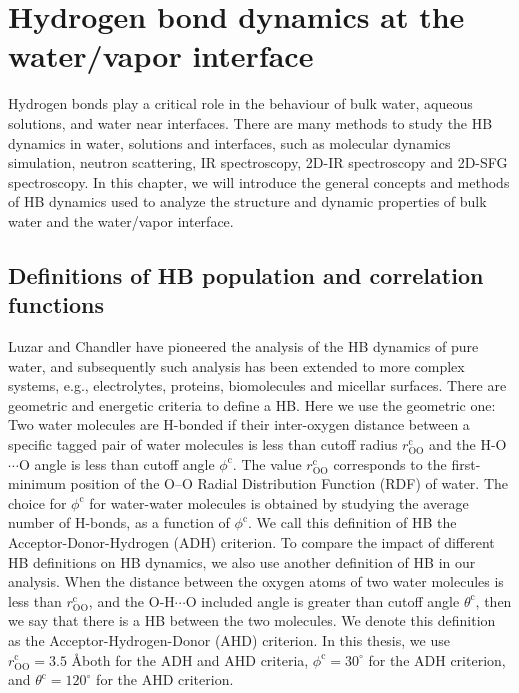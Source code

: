\chapter{Hydrogen bond dynamics at the water/vapor interface}\label{CHAPTER_HBD}
Hydrogen bonds play a critical role in the behaviour of bulk water\cite{Eisenberg1969,Luzar1996,Cabane2005}, 
aqueous solutions\cite{Naslund2005}, and water near interfaces\cite{Chowdhary2008}.
There are many methods to study the HB dynamics in water, solutions and interfaces, 
such as molecular dynamics simulation\cite{Tongraar2006,Chanda2006,Tongraar2010,Chowdhary2008,Banerjee2016}, neutron scattering\cite{ChenSH1984,Teixeira1990}, 
IR spectroscopy\cite{Werhahn2011,Fournier2016}, 2D-IR spectroscopy\cite{Auer07,Kim2009} and 2D-SFG spectroscopy\cite{ZhangZhen2011}.
In this chapter, we will introduce the general concepts and methods of HB dynamics \cite{AL96,Luzar1996,DC87} used to analyze the structure 
and dynamic properties of bulk water and the water/vapor interface. 

\section{Definitions of HB population and correlation functions}\label{para:def_HBP}
Luzar and Chandler\cite{AL96} have pioneered the analysis of the HB dynamics of pure water, and
subsequently such analysis has been extended to more complex systems, e.g., electrolytes\cite{Chandra2000}, proteins\cite{Tarek02,Matthias13}, 
biomolecules\cite{Kolano06} and micellar surfaces\cite{SP05}.
There are geometric\cite{Kumar2007} and energetic\cite{Sciortino1989} criteria to define a HB.
Here we use the geometric one:
Two water molecules are H-bonded if their inter-oxygen distance between a specific tagged pair of water molecules 
is less than cutoff radius $r^{\text{c}}_{\text{OO}}$ and
the H-O$\cdots$O angle is less than cutoff angle $\phi^{\text{c}}$\cite{AKS86,JT90,SB02}. 
The value $r^{\text{c}}_{\text{OO}}$ corresponds to the first-minimum position of the O--O Radial Distribution Function (RDF) of water\cite{Sciortino1989}.   
The choice for $\phi^{\text{c}}$ for water-water molecules is obtained by studying the average number of H-bonds,
as a function of $\phi^{\text{c}}$\cite{Luzar1993}. We call this definition of HB the Acceptor-Donor-Hydrogen (ADH) criterion. 
To compare the impact of different HB definitions on HB dynamics, we also use another definition of HB in our analysis. 
When the distance between the oxygen atoms of two water molecules is less than $r^{\text{c}}_{\text{OO}}$, 
and the O-H$\cdots$O included angle is greater than cutoff angle $\theta^{\text{c}}$, then we say that there is a HB between the two molecules. 
We denote this definition as the Acceptor-Hydrogen-Donor (AHD) criterion.
In this thesis, we use $r^{\text{c}}_{\text{OO}}=3.5$ \AA both for the ADH and AHD criteria, $\phi^{\text{c}}=30^{\circ}$ for the ADH criterion, 
and $\theta^{\text{c}}=120^{\circ}$ for the AHD criterion.

